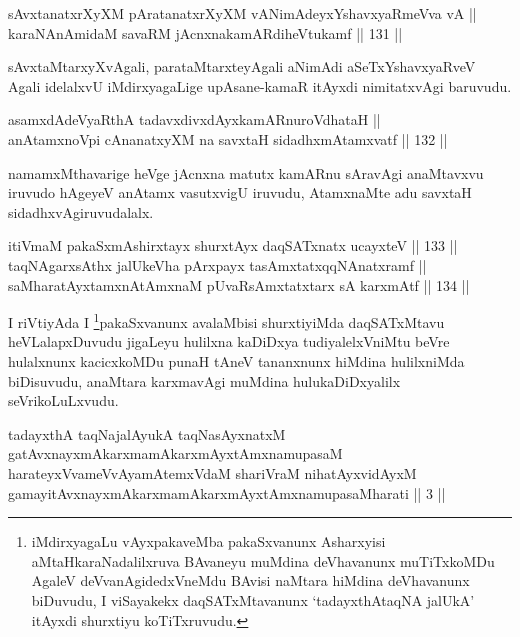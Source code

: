 \begin{shl}
sAvxtanatxrXyXM pAratanatxrXyXM vA\s NimAdeyxYshavxyaRmeVva vA || \\
karaNAnAmidaM savaRM jAcnxnakamARdiheVtukamf \hfill || 131 ||  
\end{shl}

\begin{artha}
sAvxtaMtarxyXvAgali, parataMtarxteyAgali aNimAdi aSeTxYshavxyaRveV
Agali idelalxvU iMdirxyagaLige upAsane-kamaR itAyxdi nimitatxvAgi baruvudu.
\end{artha}

\begin{shl}
asamxdAdeVyaRthA tadavxdivxdAyxkamARnuroVdhataH || \\
anAtamxnoV\s pi cA\s \s nanatxyXM na savxtaH sidadhxmAtamxvatf \hfill || 132 ||  
\end{shl}

\begin{artha}
namamxMthavarige heVge jAcnxna matutx kamARnu sAravAgi anaMtavxvu
iruvudo hAgeyeV anAtamx vasutxvigU iruvudu, AtamxnaMte adu savxtaH
sidadhxvAgiruvudalalx.
\end{artha}

\begin{shl}
itiVmaM pakaSxmAshirxtayx shurxtAyx daqSATxnatx ucayxteV \hfill || 133 || \\
taqNAgarxsAthx jalUkeVha pArxpayx tasAmxtatxqqNAnatxramf || \\
saMharatAyxtamxnA\s \s tAmxnaM pUvaRsAmxtatxtarx sA karxmAtf \hfill || 134 ||  
\end{shl}

\begin{artha}
I riVtiyAda I \footnote{iMdirxyagaLu vAyxpakaveMba pakaSxvanunx Asharxyisi
aMtaHkaraNadalilxruva BAvaneyu muMdina deVhavanunx muTiTxkoMDu AgaleV
deVvanAgidedxVneMdu BAvisi naMtara hiMdina deVhavanunx biDuvudu, I
viSayakekx daqSATxMtavanunx `tadayxthAtaqNA jalUkA' itAyxdi shurxtiyu koTiTxruvudu.}pakaSxvanunx avalaMbisi shurxtiyiMda
daqSATxMtavu heVLalapxDuvudu  jigaLeyu hulilxna kaDiDxya
tudiyalelxVniMtu beVre hulalxnunx kacicxkoMDu punaH tAneV tananxnunx
hiMdina hulilxniMda biDisuvudu, anaMtara karxmavAgi muMdina
hulukaDiDxyalilx seVrikoLuLxvudu.
\end{artha}

\begin{shl}
tadayxthA taqNajalAyukA taqNasAyxnatxM gatAvxnayxmAkarxmamAkarxmAyxtAmxnamupasaM harateyxVvameVvAyamAtemxVdaM shariVraM nihatAyx\s vidAyxM gamayitAvxnayxmAkarxmamAkarxmAyxtAmxnamupasaMharati || 3 ||
\end{shl}

